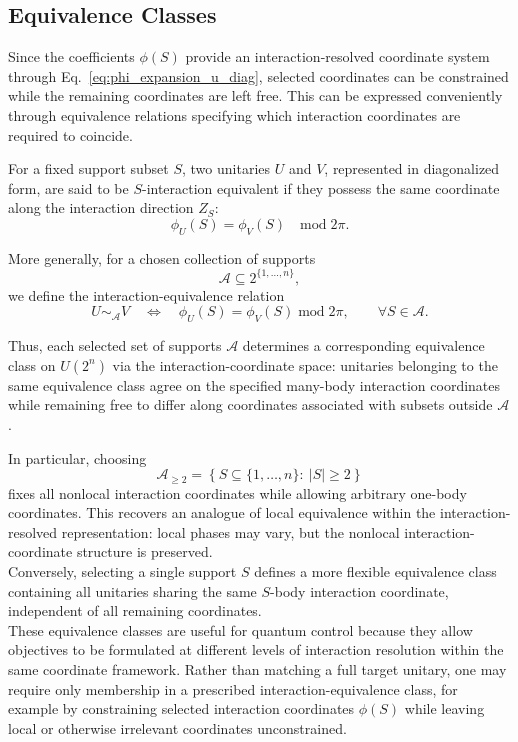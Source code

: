 \subsection{Equivalence Classes}
\label{sec:interaction_equivalence_classes}

\noindent
Since the coefficients $\phi(S)$ provide an interaction-resolved coordinate system through Eq.~\eqref{eq:phi_expansion_u_diag}, selected coordinates can be constrained while the remaining coordinates are left free. This can be expressed conveniently through equivalence relations specifying which interaction coordinates are required to coincide.

For a fixed support subset $S$, two unitaries $U$ and $V$, represented in diagonalized form, are said to be $S$-interaction equivalent if they possess the same coordinate along the interaction direction $Z_S$:
\begin{equation}
\phi_U(S)
=
\phi_V(S)
\quad \mathrm{mod}\; 2\pi.
\end{equation}

More generally, for a chosen collection of supports
\[
\mathcal{A}\subseteq 2^{\{1,\dots,n\}},
\]
we define the interaction-equivalence relation
\begin{equation}
U \sim_{\mathcal{A}} V
\quad\Longleftrightarrow\quad
\phi_U(S)=\phi_V(S)
\; \mathrm{mod}\; 2\pi,
\qquad
\forall S\in\mathcal{A}.
\end{equation}


Thus, each selected set of supports $\mathcal{A}$ determines a corresponding equivalence class on \(U(2^n)\) via the interaction-coordinate space: unitaries belonging to the same equivalence class agree on the specified many-body interaction coordinates while remaining free to differ along coordinates associated with subsets outside $\mathcal{A}$.

In particular, choosing
\[
\mathcal{A}_{\geq2}
=
\left\{
S\subseteq\{1,\dots,n\}
:\ |S|\geq2
\right\}
\]
fixes all nonlocal interaction coordinates while allowing arbitrary one-body coordinates. This recovers an analogue of local equivalence within the interaction-resolved representation: local phases may vary, but the nonlocal interaction-coordinate structure is preserved.\\

\noindent
Conversely, selecting a single support $S$ defines a more flexible equivalence class containing all unitaries sharing the same $S$-body interaction coordinate, independent of all remaining coordinates.\\

\noindent
These equivalence classes are useful for quantum control because they allow objectives to be formulated at different levels of interaction resolution within the same coordinate framework. Rather than matching a full target unitary, one may require only membership in a prescribed interaction-equivalence class, for example by constraining selected interaction coordinates $\phi(S)$ while leaving local or otherwise irrelevant coordinates unconstrained.



